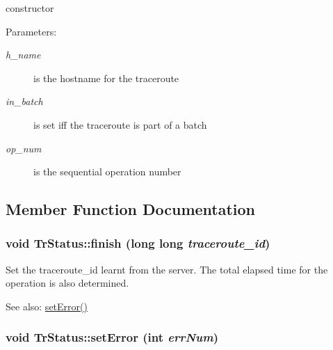 constructor \begin{Desc}
\item[Parameters:]
\begin{description}
\item[{\em h\_\-name}]is the hostname for the traceroute \item[{\em in\_\-batch}]is set iff the traceroute is part of a batch \item[{\em op\_\-num}]is the sequential operation number \end{description}
\end{Desc}


\subsection{Member Function Documentation}
\hypertarget{classTrStatus_cd81c57a0333bfd2733b48773174b890}{
\subsubsection[finish]{\setlength{\rightskip}{0pt plus 5cm}void TrStatus::finish (long long {\em traceroute\_\-id})}}
\label{classTrStatus_cd81c57a0333bfd2733b48773174b890}


Set the traceroute\_\-id learnt from the server. The total elapsed time for the operation is also determined. \begin{Desc}
\item[See also:]\hyperlink{classTrStatus_aafd283bd4ab3c0547fab9c3c82bab4f}{setError()} \end{Desc}
\hypertarget{classTrStatus_aafd283bd4ab3c0547fab9c3c82bab4f}{
\subsubsection[setError]{\setlength{\rightskip}{0pt plus 5cm}void TrStatus::setError (int {\em errNum})}}
\label{classTrStatus_aafd283bd4ab3c0547fab9c3c82bab4f}


